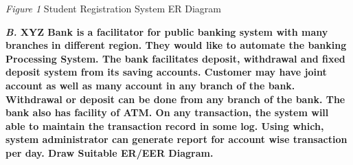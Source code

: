 \documentclass[12pt, letterpaper, twoside]{book}
\begin{document}
\begin{center}
\end{center}
\begin{center}
\emph{Figure 1} Student Registration System ER Diagram
\end{center}
\begin{flushleft}
\pagebreak
\textbf{\emph{B.} XYZ Bank is a facilitator for public banking system with many branches in different region. They would like to automate the banking Processing System. The bank facilitates deposit, withdrawal and fixed deposit system from its saving accounts. Customer may have joint account as well as many account in any branch of the bank. Withdrawal or deposit can be done from any branch of the bank. The bank also has facility of ATM. On any transaction, the system will able to maintain the transaction record in some log. Using which, system  administrator  can  generate  report  for  account  wise  transaction  per  day. Draw  Suitable  ER/EER Diagram.}
\end{flushleft}
\end{document}
